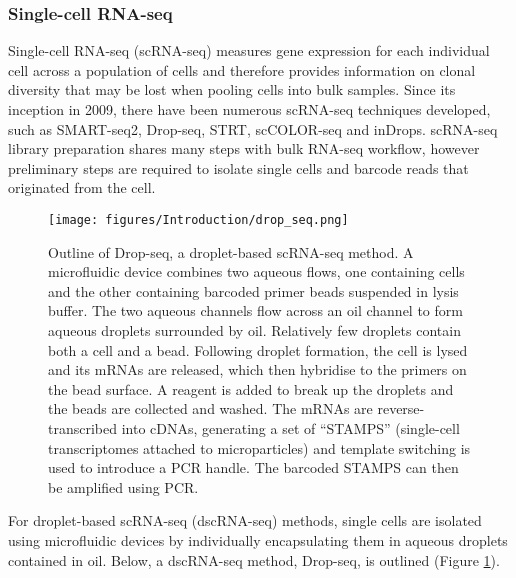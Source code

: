 \subsubsection{Single-cell RNA-seq}
Single-cell RNA-seq (scRNA-seq) measures gene expression for each individual cell across a population of cells and therefore provides information on clonal diversity that may be lost when pooling cells into bulk samples.
Since its inception in 2009\cite{tang2009mrna}, there have been numerous scRNA-seq techniques developed, such as SMART-seq2\cite{picelli2013smart}, Drop-seq\cite{macosko2015highly}, STRT\cite{islam2011characterization}, scCOLOR-seq\cite{philpott2021nanopore} and inDrops\cite{klein2015droplet}.
scRNA-seq library preparation shares many steps with bulk RNA-seq workflow, however preliminary steps are required to isolate single cells and barcode reads that originated from the cell.
\begin{figure}[hb]
\centering
\texttt{[image: figures/Introduction/drop\_seq.png]}
\caption[Drop-seq schematic]{Outline of Drop-seq, a droplet-based scRNA-seq method.
A microfluidic device combines two aqueous flows, one containing cells and the other containing barcoded primer beads suspended in lysis buffer.
The two aqueous channels flow across an oil channel to form aqueous droplets surrounded by oil.
Relatively few droplets contain both a cell and a bead.
Following droplet formation, the cell is lysed and its mRNAs are released, which then hybridise to the primers on the bead surface.
A reagent is added to break up the droplets and the beads are collected and washed.
The mRNAs are reverse-transcribed into cDNAs, generating a set of ``STAMPS'' (single-cell transcriptomes attached to microparticles) and template switching is used to introduce a PCR handle.
The barcoded STAMPS can then be amplified using PCR.}
\label{fig:dropseq}\end{figure}
For droplet-based scRNA-seq (dscRNA-seq) methods, single cells are isolated using microfluidic devices by individually encapsulating them in aqueous droplets contained in oil.
Below, a dscRNA-seq method, Drop-seq, is outlined (Figure \ref{fig:dropseq}).






